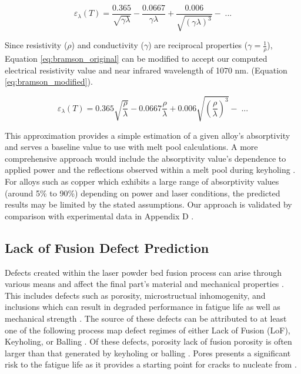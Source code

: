 \begin{equation}
\varepsilon_\lambda\left(T\right) = \frac{0.365}{\sqrt{\gamma \lambda}} -
\frac{0.0667}{\gamma \lambda} +
\frac{0.006}{\sqrt{\left(\gamma\lambda\right)^{3}}} - \;...
\label{eq:bramson_original}
\end{equation}

\noindent Since resistivity ($\rho$) and conductivity ($\gamma$) are reciprocal
properties ($\gamma = \frac{1}{\rho}$), Equation \ref{eq:bramson_original} can
be modified to accept our computed electrical resistivity value and near
infrared wavelength of 1070 nm. (Equation \ref{eq:bramson_modified}).

\begin{equation}
\varepsilon_\lambda\left(T\right) = 0.365\sqrt{\frac{\rho}{\lambda}} -
0.0667\frac{\rho}{\lambda} + 0.006\sqrt{\left(\frac{\rho}{\lambda}\right)^{3}} -
\;...
\label{eq:bramson_modified}
\end{equation}

This approximation provides a simple estimation of a given alloy's absorptivity
and serves a baseline value to use with melt pool calculations. A more
comprehensive approach would include the absorptivity value's dependence to
applied power and the reflections observed within a melt pool during keyholing
\cite{trapp_situ_2017, nordet_absorptivity_2022}. For alloys such as copper
which exhibits a large range of absorptivity values (around 5\% to 90\%)
\cite{nordet_absorptivity_2022} depending on power and laser conditions, the
predicted results may be limited by the stated assumptions. Our approach is
validated by comparison with experimental data in Appendix D
\cite{cook_determining_2023, honda_measurement_2025, mills_recommended_2002,
he_powder_2022}.

\subsection{Lack of Fusion Defect Prediction}
\label{sec:defect_prediction}
Defects created within the laser powder bed fusion process can arise through
various means and affect the final part's material and mechanical
properties \cite{gordon_defect_2020, cunningham_analyzing_2017,
ng_porosity_2009}. This includes defects such as porosity, microstructual
inhomogenity, and inclusions which can result in degraded performance in fatigue
life as well as mechanical strength \cite{gordon_defect_2020,
bellini_additive_2021}. The source of these defects can be attributed to at
least one of the following process map defect regimes of either Lack of Fusion
(LoF), Keyholing, or Balling \cite{gordon_defect_2020, cunningham_defect_2018}.
Of these defects, porosity lack of fusion porosity is often larger than that
generated by keyholing or balling \cite{shrestha_formation_2022}. Pores presents
a significant risk to the fatigue life as it provides a starting point for
cracks to nucleate from \cite{bellini_additive_2021, smith_relationship_2019}.


